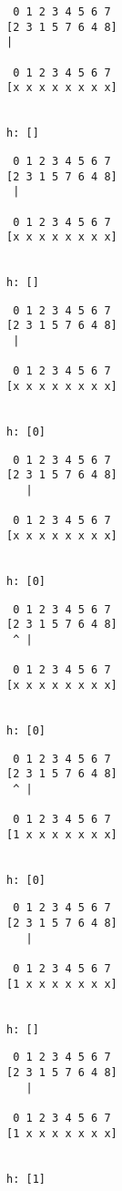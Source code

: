 { \begin{verbatim}
 0 1 2 3 4 5 6 7
[2 3 1 5 7 6 4 8]
|

 0 1 2 3 4 5 6 7
[x x x x x x x x]


h: []
\end{verbatim} }

{ \begin{verbatim}
 0 1 2 3 4 5 6 7
[2 3 1 5 7 6 4 8]
 |

 0 1 2 3 4 5 6 7
[x x x x x x x x]


h: []
\end{verbatim} }

{ \begin{verbatim}
 0 1 2 3 4 5 6 7
[2 3 1 5 7 6 4 8]
 |

 0 1 2 3 4 5 6 7
[x x x x x x x x]


h: [0]
\end{verbatim} }

{ \begin{verbatim}
 0 1 2 3 4 5 6 7
[2 3 1 5 7 6 4 8]
   |

 0 1 2 3 4 5 6 7
[x x x x x x x x]


h: [0]
\end{verbatim} }

{ \begin{verbatim}
 0 1 2 3 4 5 6 7
[2 3 1 5 7 6 4 8]
 ^ |

 0 1 2 3 4 5 6 7
[x x x x x x x x]


h: [0]
\end{verbatim} }

{ \begin{verbatim}
 0 1 2 3 4 5 6 7
[2 3 1 5 7 6 4 8]
 ^ |

 0 1 2 3 4 5 6 7
[1 x x x x x x x]


h: [0]
\end{verbatim} }

{ \begin{verbatim}
 0 1 2 3 4 5 6 7
[2 3 1 5 7 6 4 8]
   |

 0 1 2 3 4 5 6 7
[1 x x x x x x x]


h: []
\end{verbatim} }

{ \begin{verbatim}
 0 1 2 3 4 5 6 7
[2 3 1 5 7 6 4 8]
   |

 0 1 2 3 4 5 6 7
[1 x x x x x x x]


h: [1]
\end{verbatim} }

